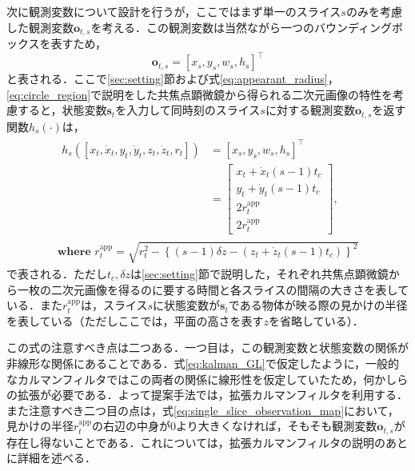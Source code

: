     次に観測変数について設計を行うが，ここではまず単一のスライス$s$のみを考慮した観測変数$\bm{o}_{t, s}$を考える．この観測変数は当然ながら一つのバウンディングボックスを表すため，
    \begin{equation}
        \label{eq:single_slice_observation}
        \bm{o}_{t, s} = \left[x_s, y_s, w_s, h_s\right]^{\top}
    \end{equation}
    と表される．ここで\ref{sec:setting}節および式\ref{eq:appearant_radius}，\ref{eq:circle_region}で説明をした共焦点顕微鏡から得られる二次元画像の特性を考慮すると，状態変数$\bm{s}_t$を入力して同時刻のスライス$s$に対する観測変数$\bm{o}_{t,s}$を返す関数$h_s(\cdot)$は，
    \begin{equation}
        \label{eq:single_slice_observation_map}
        \begin{gathered}
            \begin{aligned}
                h_s(\left[x_t, \dot{x}_t, y_t, \dot{y}_t, z_t, \dot{z}_t, r_t\right]) &= \left[x_s, y_s, w_s, h_s\right]^{\top}
                \\ &= 
                \begin{bmatrix}
                    x_t + \dot{x}_t (s - 1) t_c
                    \\ y_t + \dot{y}_t (s - 1) t_c
                    \\ 2r_t^{\text{app}}
                    \\ 2r_t^{\text{app}}
                \end{bmatrix},                
            \end{aligned}
            \\ \textbf{where } r_t^{\text{app}} = \sqrt{r_t^2 - \left\{(s - 1)\delta z - \left(z_t + \dot{z}_t (s - 1) t_c\right) \right\}^2}
        \end{gathered}
    \end{equation}
    で表される．ただし$t_c, \delta z$は\ref{sec:setting}節で説明した，それぞれ共焦点顕微鏡から一枚の二次元画像を得るのに要する時間と各スライスの間隔の大きさを表している．また$r_t^{\text{app}}$は，スライス$s$に状態変数が$\bm{s}_t$である物体が映る際の見かけの半径を表している（ただしここでは，平面の高さを表す$z$を省略している）．

    この式の注意すべき点は二つある．一つ目は，この観測変数と状態変数の関係が非線形な関係にあることである．式\ref{eq:kalman_GL}で仮定したように，一般的なカルマンフィルタではこの両者の関係に線形性を仮定していたため，何かしらの拡張が必要である．よって提案手法では，拡張カルマンフィルタ\cite{bishop2001introduction}を利用する．また注意すべき二つ目の点は，式\ref{eq:single_slice_observation_map}において，見かけの半径$r_t^{\text{app}}$の右辺の中身が$0$より大きくなければ，そもそも観測変数$\bm{o}_{t,s}$が存在し得ないことである．これについては，拡張カルマンフィルタの説明のあとに詳細を述べる．

